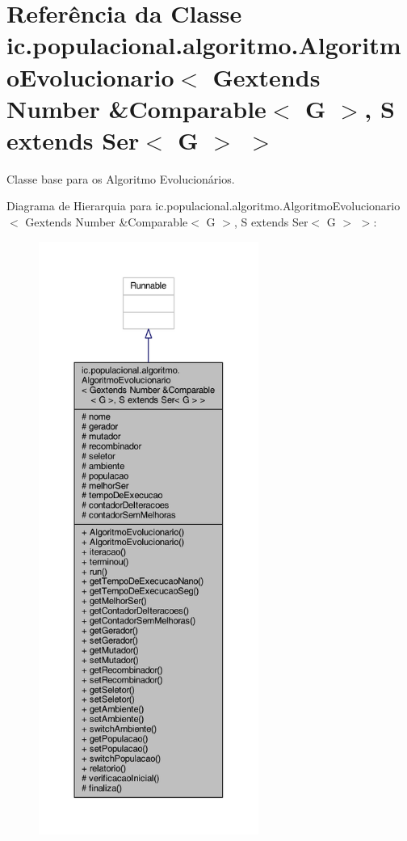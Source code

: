 \hypertarget{classic_1_1populacional_1_1algoritmo_1_1_algoritmo_evolucionario_3_01_gextends_01_number_01_6_co1efdb05fe19a950b8d1e9e15f7d06254}{\section{Referência da Classe ic.\-populacional.\-algoritmo.\-Algoritmo\-Evolucionario$<$ Gextends Number \&Comparable$<$ G $>$, S extends Ser$<$ G $>$ $>$}
\label{classic_1_1populacional_1_1algoritmo_1_1_algoritmo_evolucionario_3_01_gextends_01_number_01_6_co1efdb05fe19a950b8d1e9e15f7d06254}
}


Classe base para os Algoritmo Evolucionários.  




Diagrama de Hierarquia para ic.\-populacional.\-algoritmo.\-Algoritmo\-Evolucionario$<$ Gextends Number \&Comparable$<$ G $>$, S extends Ser$<$ G $>$ $>$\-:\nopagebreak
\begin{figure}[H]
\begin{center}
\leavevmode
\includegraphics[height=550pt]{classic_1_1populacional_1_1algoritmo_1_1_algoritmo_evolucionario_3_01_gextends_01_number_01_6_co4c08ad55e259f326d7979b430087ff12}
\end{center}
\end{figure}


